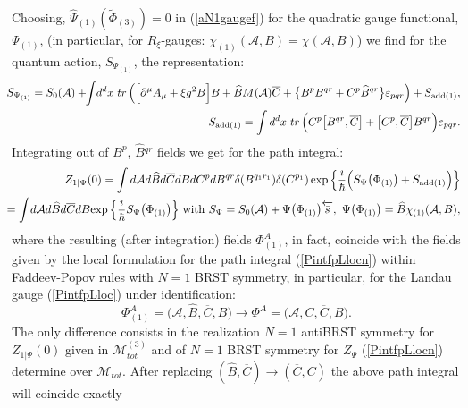 \documentclass[10pt]{article}
\begin{document}
Choosing, $\widehat{\Psi}_{(1)}(\widetilde{\Phi}_{(3)})=0$ in (\ref{aN1gaugef}) for the quadratic gauge functional,  $ \Psi_{(1)}$, (in particular, for $R_\xi$-gauges: $\chi_{(1)}(\mathcal{A},B) =\chi(\mathcal{A},B) $) we find for the quantum action,
 $S_{\Psi_{(1)}}$, the representation:
 \begin{eqnarray}
  &\hspace{-1em}& \hspace{-0.5em} S_{\Psi_{(1)}}  = S_0(\mathcal{A}) +  \hspace{-0.3em}  \int \hspace{-0.2em}d^{d}x\ tr\,\Big(\Big[    \partial^{\mu}A_{\mu
}  + {\xi g^2} B\Big]  B + \widehat{B} M(\mathcal{A}) \overline{C}   + \big\{B^p  {B}{}^{qr}  + C^p\widehat{B}{}^{qr}\big\}\varepsilon_{pqr} \Big)+S_{\mathrm{add}(1)}, \label{Sqen1}\\
  &\hspace{-1em}&  \hspace{-0.5em} S_{\mathrm{add}(1)}  = \int d^{d}x\ tr\,\Big(C^p  \big[B^{qr}, \overline{C}\big] + \big[C^p, \overline{C}\big] {B}{}^{qr}\Big)\varepsilon_{pqr} . \label{Sadd1}
   \end{eqnarray}
   Integrating out of $B^p$, $\widehat{B}{}^{qr}$ fields    we get   for the path integral:
   \begin{eqnarray}
\label{Pintlocn1fin}
  &\hspace{-1em}&\hspace{-0.5em} {Z}_{1|\Psi}(0) =  \int  d \mathcal{A} d\widehat{B}d \overline{C}dB dC^p dB^{qr}\delta({B}{}^{q_1r_1}) \delta({C}{}^{p_1}) \exp\Big\{\frac{\imath}{\hbar}\Big(S_{\Psi}\big(\Phi_{(1)}\big) +S_{\mathrm{add}(1)}\Big)\Big\}  \\
  &\hspace{-1.0em}& \hspace{-0.5em}   =\int \hspace{-0.15em} d \mathcal{A} d\widehat{B}d \overline{C}dB \hspace{-0.15em}\exp \Big\{\frac{\imath}{\hbar}S_{\Psi}\big(\Phi_{(1)}\big)\Big\}  \ \mathrm{with} \   S_{\Psi}  = S_0(\mathcal{A}) +%
\Psi \big(\Phi_{(1)}\big) \overleftarrow{\bar{s}}, \ \Psi \big(\Phi_{(1)}\big)= \widehat{B}\chi_{(1)}(\mathcal{A},B),  \label{eqZpsi0}
   \end{eqnarray}
where the resulting (after integration) fields $\Phi^A_{(1)}$, in fact, coincide with the fields given by the local formulation for the path integral (\ref{PintfpLlocn}) within Faddeev-Popov rules with $N=1$ BRST symmetry, in particular, for the Landau gauge (\ref{PintfpLloc}) under identification:
\begin{equation}\label{identN1n1}
  \Phi^A_{(1)} = \big(\mathcal{A}, \widehat{B} ,\overline{C}, B\big) \to \Phi^A = \big(\mathcal{A}, C ,\overline{C}, B\big).
\end{equation}
The only difference consists in the realization $N=1$ antiBRST symmetry for ${Z}_{1|\Psi}(0)$ given in $\mathcal{M}^{(3)}_{tot}$
and of $N=1$  BRST symmetry for ${Z}_{\Psi}$ (\ref{PintfpLlocn}) determine  over $\mathcal{M}_{tot}$.  After replacing $(\widehat{B} ,\overline{C})\to (\overline{C}, {C})$ the above path integral will coincide exactly
\end{document}
